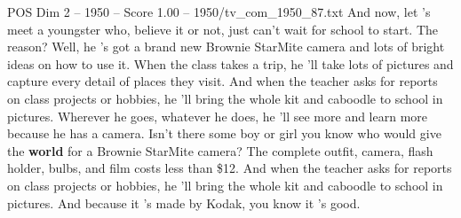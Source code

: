 \begin{textsample}{POS Dim 2 – 1950 – Score 1.00 – 1950/tv\_com\_1950\_87.txt}  \label{ex:f2_pos_018}
And now, let 's meet a youngster who, believe it or not, just can't wait for school to start.
The reason?
Well, he 's got a brand new Brownie StarMite camera and lots of bright ideas on how to use it.
When the class takes a trip, he 'll take lots of pictures and capture every detail of places they visit.
And when the teacher asks for reports on class projects or hobbies, he 'll bring the whole kit and caboodle to school in pictures.
Wherever he goes, whatever he does, he 'll see more and learn more because he has a camera.
Isn't there some boy or girl you know who would give the \textbf{world} for a Brownie StarMite camera?
The complete outfit, camera, flash holder, bulbs, and film costs less than \$12.
And when the teacher asks for reports on class projects or hobbies, he 'll bring the whole kit and caboodle to school in pictures.
And because it 's made by Kodak, you know it 's good.

\end{textsample}
